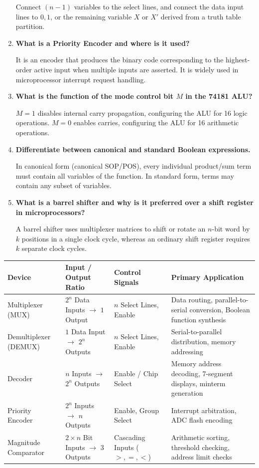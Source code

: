 \documentclass[12pt,a4paper]{article}
\newcommand{\Q}[1]{\textbf{#1}\par\noindent\ignorespaces}
\renewcommand{\arraystretch}{1.45}
\begin{document}
\begin{tcolorbox}[exambox, title={\textbf{Frequently Asked / Viva Questions}}]
\begin{enumerate}[topsep=0pt, label=\textbf{Q\arabic*.}, itemsep=5pt]
    Connect $(n-1)$ variables to the select lines, and connect the data input lines to $0, 1$, or the remaining variable $X$ or $X'$ derived from a truth table partition.
  \item \Q{What is a Priority Encoder and where is it used?}
    It is an encoder that produces the binary code corresponding to the highest-order active input when multiple inputs are asserted. It is widely used in microprocessor interrupt request handling.
  \item \Q{What is the function of the mode control bit $M$ in the 74181 ALU?}
    $M=1$ disables internal carry propagation, configuring the ALU for 16 logic operations. $M=0$ enables carries, configuring the ALU for 16 arithmetic operations.
  \item \Q{Differentiate between canonical and standard Boolean expressions.}
    In canonical form (canonical SOP/POS), every individual product/sum term must contain all variables of the function. In standard form, terms may contain any subset of variables.
  \item \Q{What is a barrel shifter and why is it preferred over a shift register in microprocessors?}
    A barrel shifter uses multiplexer matrices to shift or rotate an $n$-bit word by $k$ positions in a single clock cycle, whereas an ordinary shift register requires $k$ separate clock cycles.
\end{enumerate}
\end{tcolorbox}

\begin{tcolorbox}[tikzbox, title={Comparison of Combinational MSI Building Blocks}]
\centering
\begingroup
\footnotesize
\setlength{\tabcolsep}{3.5pt}
\setlength{\extrarowheight}{2.5pt}
\renewcommand{\arraystretch}{1.35}
\begin{tabularx}{\linewidth}{|B{2.4cm}|Y|Y|Y|}
\hline
\textbf{Device} & \textbf{Input / Output Ratio} & \textbf{Control Signals} & \textbf{Primary Application} \\
\hline
Multiplexer (MUX) & $2^n$ Data Inputs $\to$ $1$ Output & $n$ Select Lines, Enable & Data routing, parallel-to-serial conversion, Boolean function synthesis \\
\hline
Demultiplexer (DEMUX) & $1$ Data Input $\to$ $2^n$ Outputs & $n$ Select Lines, Enable & Serial-to-parallel distribution, memory addressing \\
\hline
Decoder & $n$ Inputs $\to$ $2^n$ Outputs & Enable / Chip Select & Memory address decoding, 7-segment displays, minterm generation \\
\hline
Priority Encoder & $2^n$ Inputs $\to$ $n$ Outputs & Enable, Group Select & Interrupt arbitration, ADC flash encoding \\
\hline
Magnitude Comparator & $2 \times n$ Bit Inputs $\to$ $3$ Outputs & Cascading Inputs ($>, =, <$) & Arithmetic sorting, threshold checking, address limit checks \\
\hline
\end{tabularx}
\endgroup
\end{tcolorbox}
\end{document}
